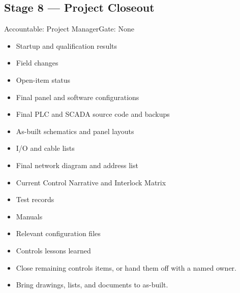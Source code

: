 \subsection{Stage 8 --- Project Closeout}
\begin{stagecard}{Accountable: Project Manager}{Gate: None}
\tcbline
\begin{minipage}[t]{0.485\linewidth}
\begin{itemize}[leftmargin=*,itemsep=1pt,topsep=2pt]
  \item Startup and qualification results
  \item Field changes
  \item Open-item status
  \item Final panel and software configurations
\end{itemize}
\end{minipage}\hfill
\begin{minipage}[t]{0.485\linewidth}
\begin{itemize}[leftmargin=*,itemsep=1pt,topsep=2pt]
  \item Final PLC and SCADA source code and backups
  \item As-built schematics and panel layouts
  \item I/O and cable lists
  \item Final network diagram and address list
  \item Current Control Narrative and Interlock Matrix
  \item Test records
  \item Manuals
  \item Relevant configuration files
  \item Controls lessons learned
\end{itemize}
\end{minipage}
\tcbline
{}
\begin{itemize}[leftmargin=*,itemsep=1pt,topsep=2pt]
  \item Close remaining controls items, or hand them off with a named owner.
  \item Bring drawings, lists, and documents to as-built.

\end{itemize}
\end{stagecard}
